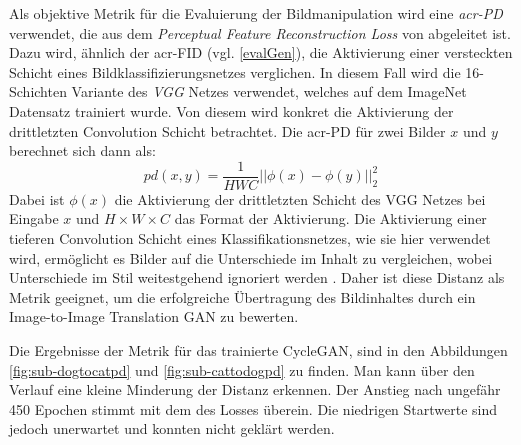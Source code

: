  Als objektive Metrik für die Evaluierung der
 Bildmanipulation wird eine \emph{\gls{acr-PD}} \cite{pang2021image} verwendet, die aus dem
 \emph{Perceptual Feature Reconstruction Loss} von
 \citeauthor{johnson_perceptual_2016} \cite{johnson_perceptual_2016} abgeleitet ist. Dazu wird, ähnlich der
 \gls{acr-FID} (vgl. \cref{evalGen}), die Aktivierung einer versteckten Schicht eines
 Bildklassifizierungsnetzes verglichen. In diesem Fall wird die 16-Schichten
 Variante des \emph{VGG} Netzes \cite{simonyan2014very} verwendet, welches auf
 dem ImageNet \cite{russakovsky2015imagenet} Datensatz trainiert wurde. Von diesem
 wird konkret die Aktivierung der drittletzten Convolution Schicht betrachtet.
 Die \gls{acr-PD} für zwei Bilder $x$ und $y$ berechnet sich dann als:
 \begin{displaymath}
	pd(x,y) = \frac{1}{HWC} ||\phi(x) - \phi(y)||_2^{2}
 \end{displaymath}
 Dabei ist $\phi(x)$ die Aktivierung der drittletzten
 Schicht des VGG Netzes bei Eingabe $x$ und $H \times W \times C$ das Format
 der Aktivierung. Die Aktivierung einer tieferen
 Convolution Schicht eines Klassifikationsnetzes, wie sie hier verwendet wird,
 ermöglicht es Bilder auf die Unterschiede im Inhalt zu vergleichen, wobei
 Unterschiede im Stil weitestgehend ignoriert werden
 \cite{johnson_perceptual_2016,pang2021image}. Daher ist diese Distanz als
 Metrik geeignet, um die erfolgreiche Übertragung des Bildinhaltes durch ein
 Image-to-Image Translation GAN zu bewerten.
 
 Die Ergebnisse der Metrik für das trainierte CycleGAN, sind in den Abbildungen \ref{fig:sub-dogtocatpd} und \ref{fig:sub-cattodogpd} zu finden. 
 Man kann über den Verlauf eine kleine Minderung der Distanz erkennen. Der Anstieg nach ungefähr 
 450 Epochen stimmt mit dem des Losses überein. Die niedrigen Startwerte sind jedoch unerwartet und 
 konnten nicht geklärt werden. 
 
 
 
